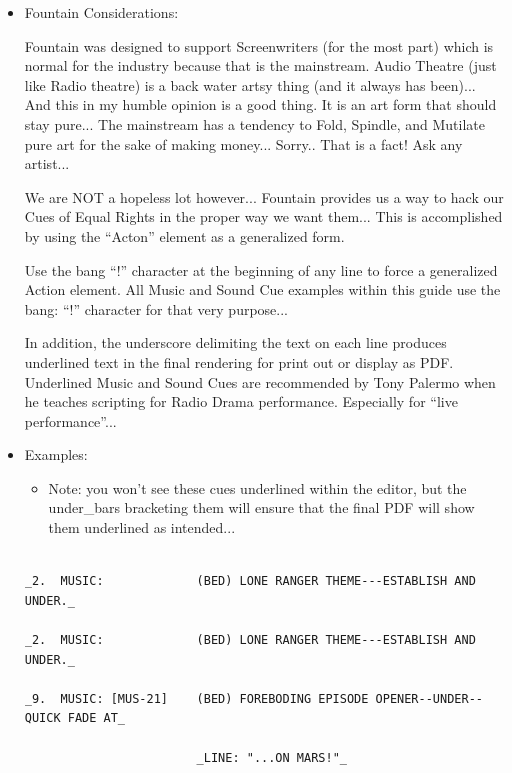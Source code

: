 \documentclass[openleft,oneside,showtrims]{memoir}
\begin{document}
\begin{itemize}
\item Fountain Considerations:
\label{sec:orge5b2852}

Fountain was designed to support Screenwriters (for the most part) which is normal for the industry because that is the mainstream.  Audio Theatre (just like Radio theatre) is a back water artsy thing (and it always has been)... And this in my humble opinion is a good thing.  It is an art form that should stay pure... The mainstream has a tendency to Fold, Spindle, and Mutilate pure art for the sake of making money... Sorry.. That is a fact! Ask any artist...

We are NOT a hopeless lot however...  Fountain provides us a way to hack our Cues of Equal Rights in the proper way we want them... This is accomplished by using the ``Acton'' element as a generalized form. 

Use the bang ``!'' character at the beginning of any line to force a generalized Action element.  All Music and Sound Cue examples within this guide use the bang: ``!'' character for that very purpose...

In addition, the underscore delimiting the text on each line produces underlined text in the final rendering for print out or display as PDF. Underlined Music and Sound Cues are recommended by Tony Palermo when he teaches scripting for Radio Drama performance.  Especially for ``live performance''...

\item Examples:
\label{sec:org5a289e2}

\begin{itemize}
\item Note: you won't see these cues underlined within the editor, but the under\_bars bracketing them will ensure that the final PDF will show them underlined as intended...
\end{itemize}

\lstset{language=fountain,label= ,caption= ,captionpos=b,numbers=none}
\begin{lstlisting}

_2.  MUSIC:             (BED) LONE RANGER THEME---ESTABLISH AND UNDER._

_2.  MUSIC:             (BED) LONE RANGER THEME---ESTABLISH AND UNDER._

_9.  MUSIC: [MUS-21]    (BED) FOREBODING EPISODE OPENER--UNDER--QUICK FADE AT_

                        _LINE: "...ON MARS!"_


\end{lstlisting}
\end{itemize}
\end{document}
